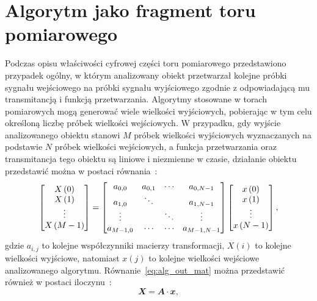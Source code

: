 \section{Algorytm jako fragment toru pomiarowego}

Podczas opisu właściwości cyfrowej części toru pomiarowego przedstawiono przypadek ogólny, w którym analizowany obiekt przetwarzał kolejne próbki sygnału wejściowego na próbki sygnału wyjściowego zgodnie z odpowiadającą mu transmitancją i funkcją przetwarzania. Algorytmy stosowane w torach pomiarowych mogą generować wiele wielkości wyjściowych, pobierając w tym celu określoną liczbę próbek wielkości wejściowych. W przypadku, gdy wyjście analizowanego obiektu stanowi $M$ próbek wielkości wyjściowych wyznaczanych na podstawie $N$ próbek wielkości wejściowych, a funkcja przetwarzania oraz transmitancja tego obiektu są liniowe i niezmienne w czasie, działanie obiektu przedstawić można w postaci równania~\cite{jakubiec_algorithms, jakubiec_single}:
\begin{equation}
\begin{bmatrix}
X \left(0\right)   \\
X \left(1\right)   \\
\vdots      \\
X \left(M-1\right)
\end{bmatrix}
=
\begin{bmatrix}
a_{0, 0}   &   a_{0, 1} &   \cdots   &   a_{0, N-1}      \\
a_{1, 0}   &   \ddots   &            &   a_{1, N-1}      \\
\vdots     &            &   \ddots   &   \vdots          \\
a_{M-1, 0} &   \cdots   &   \cdots   &   a_{M-1, N-1}
\end{bmatrix}
\begin{bmatrix}
x \left(0\right)   \\
x \left(1\right)   \\
\vdots      \\
x \left(N-1\right)
\end{bmatrix}
\label{eq:alg_out_mat},
\end{equation}
gdzie $a_{i,j}$ to kolejne współczynniki macierzy transformacji, $X(i)$ to kolejne wielkości wyjściowe, natomiast $x(j)$ to kolejne wielkości wejściowe analizowanego algorytmu. Równanie~\eqref{eq:alg_out_mat} można przedstawić również w postaci iloczynu~\cite{jakubiec_algorithms}:
\begin{equation}
\mathbfit{X} = \mathbfit{A} \cdot \mathbfit{x} \label{eq:alg_out_mul},
\end{equation}
